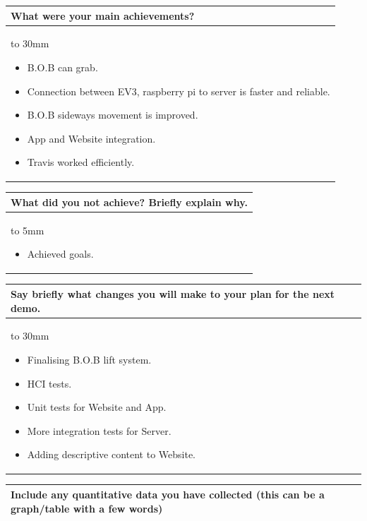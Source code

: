 \documentclass[a4paper]{article}
\newcommand{\colWidth}{141mm}
\begin{document}
\begin{center}
\begin{tabular}{|p{\colWidth}|}
	\hline
	\cellcolor{blue!25}\large
	\textbf{What were your main achievements?}
	\\ \hline
	\vtop to 30mm{
	\begin{itemize}
	    \item B.O.B can grab.
	    \item Connection between EV3, raspberry pi to server is faster and reliable.
	    \item B.O.B sideways movement is improved.
	    \item App and Website integration.
	    \item Travis worked efficiently.
	\end{itemize}
  }
  \\
  \hline
\end{tabular}
\vskip 5mm


\begin{tabular}{|p{\colWidth}|}
	\hline
	\cellcolor{blue!25}\large
	\textbf{What did you not achieve? Briefly explain why.}
	\\ \hline
	\vtop to 5mm{
	\begin{itemize}
	    \item Achieved goals.
	\end{itemize}
  }
  \\
  \hline
\end{tabular}
\vskip 5mm


\begin{tabular}{|p{\colWidth}|}
	\hline
	\cellcolor{blue!25}\large
	\textbf{Say briefly what changes you will make to your plan for the next demo.}
	\\ \hline
	\vtop to 30mm{
	\begin{itemize}
	    \item Finalising B.O.B lift system.
	    \item HCI tests.
	    \item Unit tests for Website and App. 
	    \item More integration tests for Server.
	    \item Adding descriptive content to Website. 
	\end{itemize}
  }
  \\
  \hline
\end{tabular}

\newpage
\begin{tabular}{|p{\colWidth}|}
	\hline
	\cellcolor{blue!25}\large
	\textbf{Include any quantitative data you have collected (this can be a graph/table with a few words)}
  \\
  \hline
\end{tabular}


\end{center}
\end{document}
